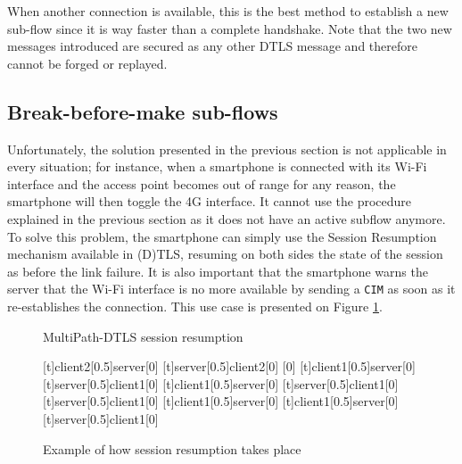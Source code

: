 When another connection is available, this is the best method to establish a new sub-flow since it is way faster than a complete handshake. Note that the two new messages introduced are secured as any other DTLS message and therefore cannot be forged or replayed.


\subsection{Break-before-make sub-flows\label{sec:breakbeforemake}}
Unfortunately, the solution presented in the previous section is not applicable in every situation; for instance, when a smartphone is connected with its Wi-Fi interface and the access point becomes out of range for any reason, the smartphone will then toggle the 4G interface. It cannot use the procedure explained in the previous section as it does not have an active subflow anymore. To solve this problem, the smartphone can simply use the Session Resumption mechanism available in (D)TLS, resuming on both sides the state of the session as before the link failure. It is also important that the smartphone warns the server that the Wi-Fi interface is no more available by sending a \texttt{CIM} as soon as it re-establishes the connection. This use case is presented on Figure \ref{fig:dtls-sessionresumption}.

\begin{figure}[!ht]
\centering
\begin{msc}[r]{MultiPath-DTLS session resumption}

\setlength{\instfootheight}{0em}
\setlength{\instheadheight}{0em}
\setlength{\instdist}{0.33\linewidth}
\setlength{\levelheight}{3em}


[t]{client2}[0.5]{server}[0]
\nextlevel
{}[t]{server}[0.5]{client2}[0]
\nextlevel
{}[0]
\nextlevel
{}
\nextlevel
{}
\nextlevel
{}[t]{client1}[0.5]{server}[0]
\nextlevel
{}[t]{server}[0.5]{client1}[0]
\nextlevel
{}[t]{client1}[0.5]{server}[0]
\nextlevel
{}[t]{server}[0.5]{client1}[0]
\nextlevel
{}[t]{server}[0.5]{client1}[0]
\nextlevel
{}[t]{client1}[0.5]{server}[0]
\nextlevel
{}[t]{client1}[0.5]{server}[0]
\nextlevel
{}[t]{server}[0.5]{client1}[0]
\nextlevel[2]

\end{msc}
\caption{Example of how session resumption takes place}
\label{fig:dtls-sessionresumption}
\end{figure}

